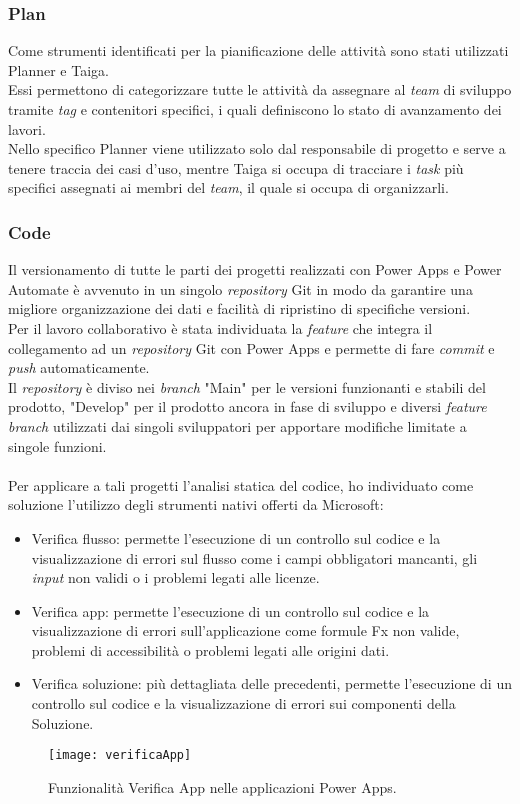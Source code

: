 \subsubsection*{Plan}
Come strumenti identificati per la pianificazione delle attività sono stati utilizzati Planner e Taiga.\\
Essi permettono di categorizzare tutte le attività da assegnare al \emph{team} di sviluppo tramite \emph{tag} e contenitori specifici, i quali definiscono lo stato di avanzamento dei lavori.\\
Nello specifico Planner viene utilizzato solo dal responsabile di progetto e serve a tenere traccia dei casi d'uso, mentre Taiga si occupa di tracciare i \emph{task} più specifici assegnati ai membri del \emph{team}, il quale si occupa di organizzarli.

\subsubsection*{Code}
Il versionamento di tutte le parti dei progetti realizzati con Power Apps e Power Automate è avvenuto in un singolo \emph{repository} Git in modo da garantire una migliore organizzazione dei dati e facilità di ripristino di specifiche versioni.\\
Per il lavoro collaborativo è stata individuata la \emph{feature} che integra il collegamento ad un \emph{repository} Git con Power Apps e permette di fare \emph{commit} e \emph{push} automaticamente.\\
Il \emph{repository} è diviso nei \emph{branch} "Main" per le versioni funzionanti e stabili del prodotto, "Develop" per il prodotto ancora in fase di sviluppo e diversi \emph{feature branch} utilizzati dai singoli sviluppatori per apportare modifiche limitate a singole funzioni.\\\\ 
Per applicare a tali progetti l'analisi statica del codice, ho individuato come soluzione l'utilizzo degli strumenti nativi offerti da Microsoft:
\begin{itemize}
    \item Verifica flusso: permette l'esecuzione di un controllo sul codice e la visualizzazione di errori sul flusso come i campi obbligatori mancanti, gli \emph{input} non validi o i problemi legati alle licenze. 
    \item Verifica app: permette l'esecuzione di un controllo sul codice e la visualizzazione di errori sull'applicazione come formule Fx non valide, problemi di accessibilità o problemi legati alle origini dati. 
    \item Verifica soluzione: più dettagliata delle precedenti, permette l'esecuzione di un controllo sul codice e la visualizzazione di errori sui componenti della Soluzione.\\
\end{itemize}
\begin{figure}[htbp] 
    \centering 
    \texttt{[image: verificaApp]} 
    \caption{Funzionalità Verifica App nelle applicazioni Power Apps.}
    \label{fig:verificaApp}
\end{figure}

